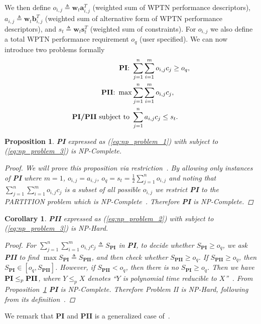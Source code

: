 \documentclass[11pt,draftclsnofoot,journal,onecolumn]{IEEEtran}
\newtheorem{proposition}{Proposition}
\newtheorem{corollary}{Corollary}
\begin{document}
We then define $o_{i,j}\triangleq\mathbf{w}_{t}\mathbf{a}_{i,j}^{T}$ (weighted sum of WPTN performance descriptors), $a_{i,j}\triangleq\mathbf{w}_{t}\mathbf{b}_{i,j}^{T}$ (weighted sum of alternative form of WPTN performance descriptors), and $s_{t}\triangleq\mathbf{w}_{t}\mathbf{s}_{t}^{T}$ (weighted sum of constraints). For $o_{i,j}$ we also define a total WPTN performance requirement $o_{q}$ (user specified). We can now introduce two problems formally
\begin{subequations}
\begin{align}
\text{\textbf{PI}:~}& \sum_{j = 1}^n \sum_{i = 1}^m o_{i,j}c_{j} \geq o_{q}, \label{eq:np_problem_1}\\	
\text{\textbf{PII}:~}\max & \sum_{j = 1}^n \sum_{i = 1}^m o_{i,j}c_{j}, \label{eq:np_problem_2}\\	
\text{\textbf{PI/PII} subject to~}& \sum_{j = 1}^n a_{i,j}c_{j} \leq s_{t}. \label{eq:np_problem_3}
\end{align}
\label{eq:np_problem_st}
\end{subequations}
\begin{proposition}
\textbf{PI} expressed as (\ref{eq:np_problem_1}) with subject to (\ref{eq:np_problem_3}) is NP-Complete. 
\begin{proof}
We will prove this proposition via restriction~\cite[Sec. 3.2.1]{Garey:1979:bell}. By allowing only instances of \textbf{PI} where $m=1$, $o_{i,j}=a_{i,j}$, $o_q=s_t= \frac{1}{2} \sum\nolimits_{j = 1}^n o_{i,j}$ and noting that $\sum\nolimits_{j=1}^{n}\sum\nolimits_{i=1}^{m}o_{i,j}c_{j}$ is a subset of all possible $o_{i,j}$ we restrict \textbf{PI} to the PARTITION problem which is NP-Complete~\cite[Sec. 3.1]{Garey:1979:bell}. Therefore \textbf{PI} is NP-Complete.
\end{proof}
\label{theo:np-complete}
\end{proposition}
\begin{corollary}
\textbf{PII} expressed as (\ref{eq:np_problem_2}) with subject to (\ref{eq:np_problem_3}) is NP-Hard. 
\begin{proof}
For $ \sum\nolimits_{j = 1}^n \sum\nolimits_{i = 1}^m o_{i,j}c_{j}\triangleq S_{\textbf{PI}} $ in \textbf{PI}, to decide whether $S_{\textbf{PI}} \geq o_q$, we ask \textbf{PII} to find $\max S_{\textbf{PI}} \triangleq S_{\textbf{PII}}$, and then check whether $S_{\textbf{PII}} \geq o_q$. If $S_{\textbf{PII}} \geq o_q$, then $S_{\textbf{PI}}\in[o_q,S_{\textbf{PII}}] $. However, if $S_{\textbf{PII}} < o_q$, then there is no $S_{\textbf{PI}} \geq o_q$. Then we have $\text{\textbf{PI}} \leq_{p} \text{\textbf{PII}}$, where $Y\leq_{p} X$ denotes ``$Y$ is polynomial time reducible to $X$''~\cite[Sec. 8.1]{kleinberg:2005:algo_design}. From Proposition~\ref{theo:np-complete} \textbf{PI} is NP-Complete. Therefore Problem II is NP-Hard, following from its definition~\cite[pp. 80]{leeuwen:1990:handbook}.
\end{proof}
\label{theo:np-hard}
\end{corollary}
We remark that \textbf{PI} and \textbf{PII} is a generalized case of~\cite[(3)]{dai_infocom_2014}.
\end{document}
